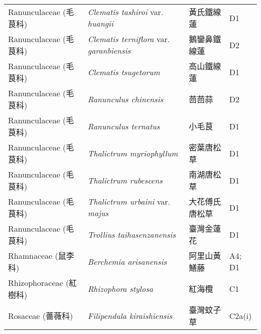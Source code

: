 \begin{longtable}{p{3cm}p{5cm}p{3cm}p{4cm}}
    Ranunculaceae (毛茛科) & \textit{Clematis tashiroi} var. \textit{huangii}  & 黃氏鐵線蓮 & D1 \index{Clematis@\textit{Clematis}!tashiroi@\textit{tashiroi}!var. huangii@var. \textit{huangii}}  \index{黃氏鐵線蓮} \\
    Ranunculaceae (毛茛科) & \textit{Clematis terniflora} var. \textit{garanbiensis}  & 鵝鑾鼻鐵線蓮 & D2 \index{Clematis@\textit{Clematis}!terniflora@\textit{terniflora}!var. garanbiensis@var. \textit{garanbiensis}}  \index{鵝鑾鼻鐵線蓮} \\
    Ranunculaceae (毛茛科) & \textit{Clematis tsugetorum}  & 高山鐵線蓮 & D1 \index{Clematis@\textit{Clematis}!tsugetorum@\textit{tsugetorum}}  \index{高山鐵線蓮} \\
    Ranunculaceae (毛茛科) & \textit{Ranunculus chinensis}  & 茴茴蒜 & D2 \index{Ranunculus@\textit{Ranunculus}!chinensis@\textit{chinensis}}  \index{茴茴蒜} \\
    Ranunculaceae (毛茛科) & \textit{Ranunculus ternatus}  & 小毛茛 & D1 \index{Ranunculus@\textit{Ranunculus}!ternatus@\textit{ternatus}}  \index{小毛茛} \\
    Ranunculaceae (毛茛科) & \textit{Thalictrum myriophyllum}  & 密葉唐松草 & D1 \index{Thalictrum@\textit{Thalictrum}!myriophyllum@\textit{myriophyllum}}  \index{密葉唐松草} \\
    Ranunculaceae (毛茛科) & \textit{Thalictrum rubescens}  & 南湖唐松草 & D1 \index{Thalictrum@\textit{Thalictrum}!rubescens@\textit{rubescens}}  \index{南湖唐松草} \\
    Ranunculaceae (毛茛科) & \textit{Thalictrum urbaini} var. \textit{majus}  & 大花傅氏唐松草 & D1 \index{Thalictrum@\textit{Thalictrum}!urbaini@\textit{urbaini}!var. majus@var. \textit{majus}}  \index{大花傅氏唐松草} \\
    Ranunculaceae (毛茛科) & \textit{Trollius taihasenzanensis}  & 臺灣金蓮花 & D1 \index{Trollius@\textit{Trollius}!taihasenzanensis@\textit{taihasenzanensis}}  \index{臺灣金蓮花} \\
    Rhamnaceae (鼠李科) & \textit{Berchemia arisanensis}  & 阿里山黃鱔藤 & A4; D1 \index{Berchemia@\textit{Berchemia}!arisanensis@\textit{arisanensis}}  \index{阿里山黃鱔藤} \\
    Rhizophoraceae (紅樹科) & \textit{Rhizophora stylosa}  & 紅海欖 & C1 \index{Rhizophora@\textit{Rhizophora}!stylosa@\textit{stylosa}}  \index{紅海欖} \\
    Rosaceae (薔薇科) & \textit{Filipendula kiraishiensis}  & 臺灣蚊子草 & C2a(i) \index{Filipendula@\textit{Filipendula}!kiraishiensis@\textit{kiraishiensis}}  \index{臺灣蚊子草} \\

\end{longtable}
